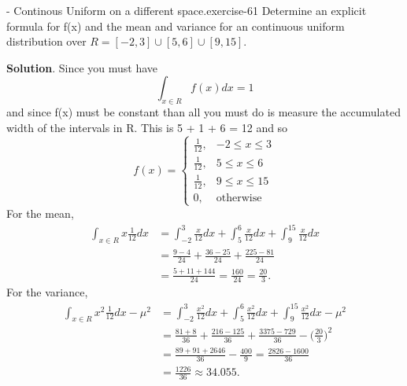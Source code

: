 \documentclass[10pt,]{book}
\numberwithin{equation}{section}
\begin{document}
%
\par
\hypertarget{p-879}{}%
\begin{inlineexercise}{- Continous Uniform on a different space.}{exercise-61}%
\hypertarget{p-880}{}%
Determine an explicit formula for f(x) and the mean and variance for an continuous uniform distribution over \(R = [-2,3] \cup [5,6] \cup [9,15]\).%
\par\smallskip%
\noindent\textbf{Solution}.\hypertarget{solution-26}{}\quad%
\hypertarget{p-881}{}%
Since you must have%
\begin{equation*}
\int_{x \in R} f(x) dx = 1
\end{equation*}
and since f(x) must be constant than all you must do is measure the accumulated width of the intervals in R. This is 5 + 1 + 6 = 12 and so%
\begin{equation*}
f(x)=\left\{\begin{matrix}
\frac{1}{12}, & -2 \le x \le 3
\\ \frac{1}{12}, & 5 \le x \le 6
\\ \frac{1}{12}, & 9 \le x \le 15
\\ 0, & \text{otherwise}
\end{matrix}\right.
\end{equation*}
For the mean,%
\begin{align*}
\int_{x \in R} x \frac{1}{12} dx & = \int_{-2}^3 \frac{x}{12} dx + \int_5^6 \frac{x}{12} dx + \int_9^{15} \frac{x}{12} dx\\
& = \frac{9-4}{24} + \frac{36-25}{24} + \frac{225-81}{24}\\
& = \frac{5+11+144}{24} = \frac{160}{24} = \frac{20}{3}.
\end{align*}
For the variance,%
\begin{align*}
\int_{x \in R} x^2 \frac{1}{12} dx - \mu^2 & = \int_{-2}^3 \frac{x^2}{12} dx + \int_5^6 \frac{x^2}{12} dx + \int_9^{15} \frac{x^2}{12} dx - \mu^2\\
& = \frac{81+8}{36} + \frac{216-125}{36} + \frac{3375-729}{36} - \big ( \frac{20}{3} \big )^2\\
& = \frac{89+91+2646}{36} - \frac{400}{9} = \frac{2826-1600}{36} \\
& = \frac{1226}{36} \approx	34.055.
\end{align*}
%
\end{inlineexercise}
%
\par
\hypertarget{p-882}{}%
\end{document}
